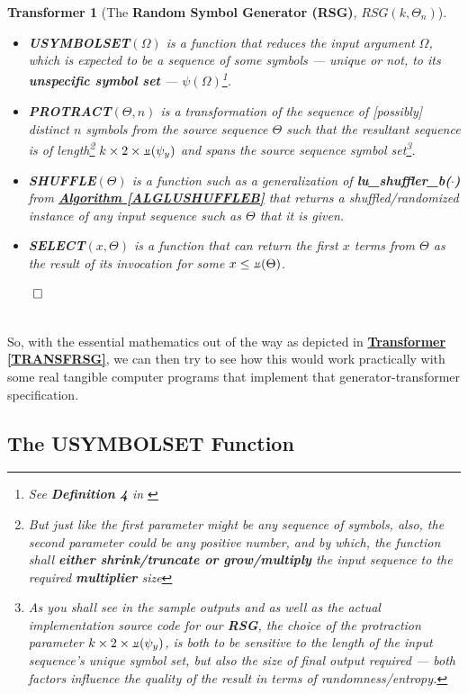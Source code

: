 \documentclass[a4paper, 18pt]{book} %
\newtheorem{transf}{Transformer}
\newcommand{\invpi}{\rotatebox[origin=c]{180}{$\pi$}}
\begin{document}
{\begin{minipage}{0.9\textwidth}
\begin{transf}[The \textbf{Random Symbol Generator (RSG)}, $RSG(k,\Theta_n)$]
\begin{itemize}
{}
\item \textbf{USYMBOLSET}$(\Omega)$ is a function that reduces the input argument $\Omega$, which is expected to be a sequence of some symbols --- unique or not, to its \textbf{unspecific symbol set} --- $\psi(\Omega)$\footnote{See \textbf{Definition 4} in \cite{ossipaper}}.
\item \textbf{PROTRACT}$(\Theta, n)$ is a transformation of the sequence of [possibly] distinct $n$ symbols from the source sequence $\Theta$ such that the resultant sequence is of length\footnote{But just like the first parameter might be any sequence of symbols, also, the second parameter could be any positive number, and by which, the function shall \textbf{either shrink/truncate or grow/multiply} the input sequence to the required \textbf{multiplier} size} $k \times 2 \times \invpi(\psi_y)$ and spans the source sequence symbol set\footnote{As you shall see in the sample outputs and as well as the actual implementation source code for our \textbf{RSG}, the choice of the protraction parameter $k \times 2 \times \invpi(\psi_y)$, is both to be sensitive to the length of the input sequence's unique symbol set, but also the size of final output required --- both factors influence the quality of the result in terms of randomness/entropy.}.
\item  \textbf{SHUFFLE}$(\Theta)$ is a function such as a generalization of \textbf{lu\_shuffler\_b($\cdot$)} from \textbf{\hyperref[ALGLUSHUFFLEB]{Algorithm \ref{ALGLUSHUFFLEB}}} that returns a shuffled/randomized instance of any input sequence such as $\Theta$ that it is given.
\item \textbf{SELECT}$(x, \Theta)$ is a function that can return the first $x$ terms from $\Theta$ as the result of its invocation for some $x \leq \invpi(\Theta)$.
\end{itemize}
$\qed$
\end{transf}
\end{minipage}}
\\

So, with the essential mathematics out of the way as depicted in \textbf{\hyperref[TRANSFRSG]{Transformer \ref{TRANSFRSG}}}, we can then try to see how this would work practically with some real tangible computer programs that implement that generator-transformer specification.

\subsection{The USYMBOLSET Function}
\end{document}
